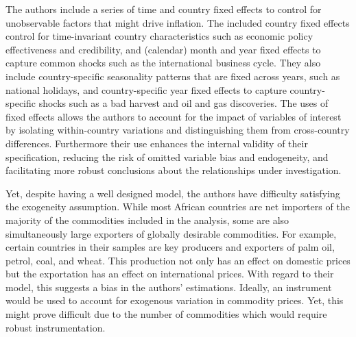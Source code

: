 \documentclass[11pt]{article}
\begin{document}
\begin{spacing}{2}
		The authors include a series of time and country fixed effects to control for unobservable factors that might drive inflation. The included country fixed effects control for time-invariant country characteristics such as economic policy effectiveness and credibility, and (calendar) month and year fixed effects to capture common shocks such as the international business cycle. They also include country-specific seasonality patterns that are fixed across years, such as national holidays, and country-specific year fixed effects to capture country-specific shocks such as a bad harvest and oil and gas discoveries. The uses of fixed effects allows the authors to account for the impact of variables of interest by isolating within-country variations and distinguishing them from cross-country differences. Furthermore their use enhances the internal validity of their specification, reducing the risk of omitted variable bias and endogeneity, and facilitating more robust conclusions about the relationships under investigation.
		
		Yet, despite having a well designed model, the authors have difficulty satisfying the exogeneity assumption. While most African countries are net importers of the majority of the commodities included in the analysis, some are also simultaneously large exporters of globally desirable commodities. For example, certain countries in their samples are key producers and exporters of palm oil, petrol, coal, and wheat. This production not only has an effect on domestic prices but the exportation has an effect on international prices. With regard to their model, this suggests a bias in the authors' estimations. Ideally, an instrument would be used to account for exogenous variation in commodity prices.  Yet, this might prove difficult due to the number of commodities which would require robust instrumentation.  
		

\end{spacing}
\end{document}
